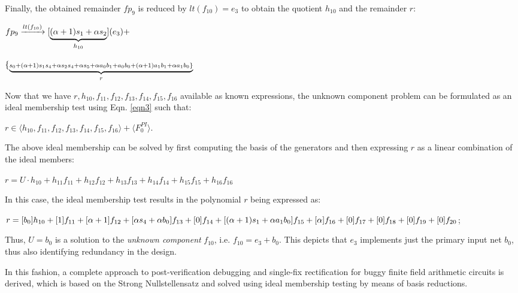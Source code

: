 \begin{Example}
Finally, the obtained remainder $fp_9$ is reduced by $lt(f_{10}) =
e_3$ to obtain the quotient $h_{10}$ and the remainder $r$: 

${ fp_9}\xrightarrow[]{{lt(f_{10})}}[\underbrace{{(\alpha+1)s_1+\alpha s_2}}_\text{$h_{10}$}]({e_3})+$ 

$\{\underbrace{{\scriptstyle s_0+(\alpha+1)s_1s_4+\alpha s_2s_4+\alpha s_5+\alpha a_0b_1+a_0b_0+(\alpha+1)a_1b_1+\alpha a_1b_0\}}}_\text{$r$}$ 

Now that we have $r,h_{10},f_{11},f_{12},f_{13},f_{14},f_{15},f_{16}$
available as known expressions, the unknown component problem can be
formulated as an ideal membership test using Eqn. \ref{eqn3} such that: 
\begin{center}
$r \in \langle h_{10},f_{11},f_{12},f_{13},f_{14},f_{15},f_{16}\rangle
  + \langle F_{0}^{PI}\rangle$.
\end{center}

The above ideal membership can be solved by first computing the
\Grobner basis of the generators and then expressing $r$ as a
linear combination of the ideal members: %

\begin{small}
$r = U\cdot h_{10} + h_{11}f_{11} + h_{12}f_{12}+h_{13}f_{13}+h_{14}f_{14}+h_{15}f_{15}+h_{16}f_{16}$ 
\end{small}

In this case, the ideal membership test results in the polynomial $r$
being expressed as: 


\begin{small}
$r = [b_0]h_{10}+[1]f_{11}+[\alpha+1]f_{12}+[\alpha s_4 +\alpha b_0]f_{13}+[0]f_{14}+[(\alpha+1)s_1+\alpha a_1b_0]f_{15}+[\alpha]f_{16}+[0]f_{17}+[0]f_{18}+[0]f_{19}+[0]f_{20}$;
\end{small}

Thus, $U=b_0$ is a solution to the \textit{unknown component}
$f_{10}$, i.e. $f_{10} = e_3 + b_0$. This depicts that $e_3$ implements
just the primary input net $b_0$, thus also identifying redundancy in
the design. 

\end{Example}

In this fashion, a complete approach to post-verification debugging
and single-fix rectification for buggy finite field arithmetic
circuits is derived, which is based on the Strong Nullstellensatz and
solved using ideal membership testing by means of \Grobner basis
reductions. 
